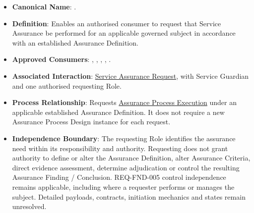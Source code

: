 \begin{itemize}

\item
\textbf{Canonical Name}: \texttt{}.



\item
\textbf{Definition}: Enables an authorised consumer to request that Service Assurance be performed for an applicable governed subject in accordance with an established Assurance Definition.



\item
\textbf{Approved Consumers}: \texttt{}, \texttt{}, \texttt{}, \texttt{}, \texttt{}.



\item
\textbf{Associated Interaction}: \href{https://github.com/fhirfactory/harmonia/blob/98410db60155198a75f74c79d98060070209faa1/docs/markdown/03-business-architecture/collaborations-interactions/interactions.md\#service-assurance-request}{Service Assurance Request}, with Service Guardian and one authorised requesting Role.



\item
\textbf{Process Relationship}: Requests \href{https://github.com/fhirfactory/harmonia/blob/98410db60155198a75f74c79d98060070209faa1/docs/markdown/03-business-architecture/processes/business-processes.md\#assurance-process-execution}{Assurance Process Execution} under an applicable established Assurance Definition. It does not require a new Assurance Process Design instance for each request.



\item
\textbf{Independence Boundary}: The requesting Role identifies the assurance need within its responsibility and authority. Requesting does not grant authority to define or alter the Assurance Definition, alter Assurance Criteria, direct evidence assessment, determine adjudication or control the resulting Assurance Finding /\allowbreak{} Conclusion. REQ-FND-005 control independence remains applicable, including where a requester performs or manages the subject. Detailed payloads, contracts, initiation mechanics and states remain unresolved.



\end{itemize}
\label{rad:assurance:173}



